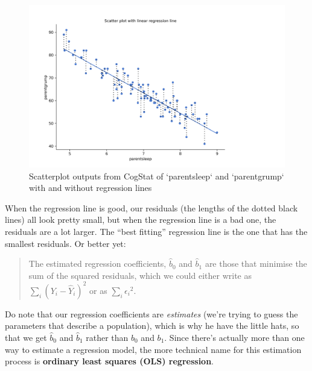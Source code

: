 \documentclass[
]{book}
\theoremstyle{definition}
\theoremstyle{definition}
\theoremstyle{definition}
\theoremstyle{definition}
\theoremstyle{remark}
\begin{document}
\begin{figure}

{\centering \includegraphics[width=0.66\linewidth]{resources/image/parentresiduallines} 

}

\caption{Scatterplot outputs from CogStat of `parentsleep` and `parentgrump` with and without regression lines}\label{fig:parentscatterswithresiduals}
\end{figure}

When the regression line is good, our residuals (the lengths of the dotted black lines) all look pretty small, but when the regression line is a bad one, the residuals are a lot larger. The ``best fitting'' regression line is the one that has the smallest residuals. Or better yet:

\begin{quote}
The estimated regression coefficients, \(\hat{b}_0\) and \(\hat{b}_1\) are those that minimise the sum of the squared residuals, which we could either write as \(\sum_i (Y_i - \hat{Y}_i)^2\) or as \(\sum_i {\epsilon_i}^2\).
\end{quote}

Do note that our regression coefficients are \emph{estimates} (we're trying to guess the parameters that describe a population), which is why he have the little hats, so that we get \(\hat{b}_0\) and \(\hat{b}_1\) rather than \(b_0\) and \(b_1\). Since there's actually more than one way to estimate a regression model, the more technical name for this estimation process is \textbf{ordinary least squares (OLS) regression}.
\end{document}

